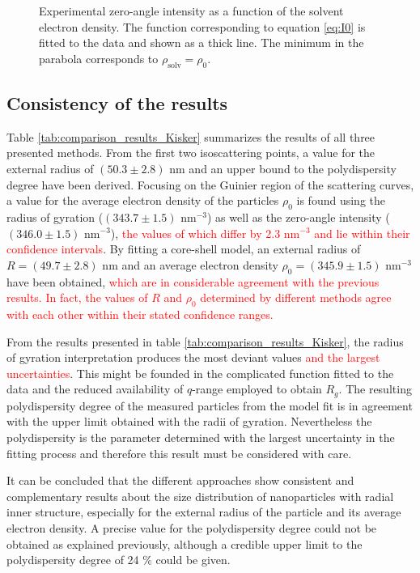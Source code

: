 \begin{figure}%
	\centering
		
		\caption[Zero-angle intensity of the PS-COOH particles.]{Experimental zero-angle intensity as a function of the solvent electron density. The function corresponding to equation \ref{eq:I0} is fitted to the data and shown as a thick line. The minimum in the parabola corresponds to $\rho_{\text{solv}}=\rho_0$.}
		\label{fig:KiskerIntensityParabola}
\end{figure}

\subsection{Consistency of the results}
Table \ref{tab:comparison_results_Kisker} summarizes the results of all three presented methods. From the first two isoscattering points, a value for the external radius of $\left( 50.3\pm2.8 \right)$ nm and an upper bound to the polydispersity degree have been derived. Focusing on the Guinier region of the scattering curves, a value for the average electron density of the particles $\rho_0$ is found using the radius of gyration ($\left( 343.7 \pm 1.5 \right)$ nm$^{-3}$) as well as the zero-angle intensity ($\left( 346.0 \pm 1.5 \right)$ nm$^{-3}$), \textcolor{red}{the values of which differ by 2.3 nm\(^{-3}\) and lie within their confidence intervals}. By fitting a core-shell model, an external radius of \(R=\left(49.7 \pm 2.8 \right)\) nm and an average electron density $\rho_0=\left(345.9\pm1.5\right)$ nm$^{-3}$ have been obtained, \textcolor{red}{which are in considerable agreement with the previous results. In fact, the values of $R$ and $\rho_0$ determined by different methods agree with each other within their stated confidence ranges.}

From the results presented in table \ref{tab:comparison_results_Kisker}, the radius of gyration interpretation produces the most deviant values \textcolor{red}{and the largest uncertainties}. This might be founded in the complicated function fitted to the data and the reduced availability of $q$-range employed to obtain \( R_g \). The resulting polydispersity degree of the measured particles from the model fit is in agreement with the upper limit obtained with the radii of gyration. Nevertheless the polydispersity is the parameter determined with the largest uncertainty in the fitting process and therefore this result must be considered with care.

It can be concluded that the different approaches show consistent and complementary results about the size distribution of nanoparticles with radial inner structure, especially for the external radius of the particle and its average electron density. A precise value for the polydispersity degree could not be obtained as explained previously, although a credible upper limit to the polydispersity degree of 24 $\%$ could be given.

